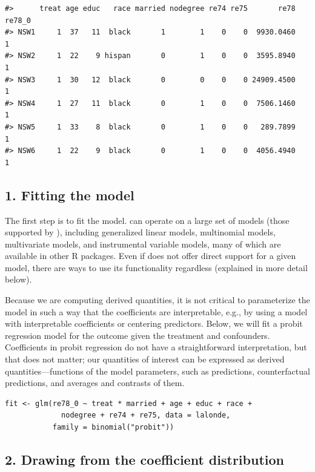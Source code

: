 \begin{verbatim}
#>      treat age educ   race married nodegree re74 re75       re78 re78_0
#> NSW1     1  37   11  black       1        1    0    0  9930.0460      1
#> NSW2     1  22    9 hispan       0        1    0    0  3595.8940      1
#> NSW3     1  30   12  black       0        0    0    0 24909.4500      1
#> NSW4     1  27   11  black       0        1    0    0  7506.1460      1
#> NSW5     1  33    8  black       0        1    0    0   289.7899      1
#> NSW6     1  22    9  black       0        1    0    0  4056.4940      1
\end{verbatim}

\hypertarget{fitting-the-model}{%
\subsection{1. Fitting the model}\label{fitting-the-model}}

The first step is to fit the model.  can operate on a large set of models (those supported by ), including generalized linear models, multinomial models, multivariate models, and instrumental variable models, many of which are available in other R packages. Even if  does not offer direct support for a given model, there are ways to use its functionality regardless (explained in more detail below).

Because we are computing derived quantities, it is not critical to parameterize the model in such a way that the coefficients are interpretable, e.g., by using a model with interpretable coefficients or centering predictors. Below, we will fit a probit regression model for the outcome given the treatment and confounders. Coefficients in probit regression do not have a straightforward interpretation, but that does not matter; our quantities of interest can be expressed as derived quantities---functions of the model parameters, such as predictions, counterfactual predictions, and averages and contrasts of them.

\begin{verbatim}
fit <- glm(re78_0 ~ treat * married + age + educ + race +
             nodegree + re74 + re75, data = lalonde,
           family = binomial("probit"))
\end{verbatim}

\hypertarget{drawing-from-the-coefficient-distribution}{%
\subsection{2. Drawing from the coefficient distribution}\label{drawing-from-the-coefficient-distribution}}

